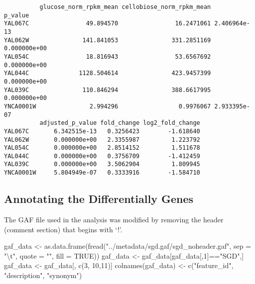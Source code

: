 \documentclass[
  letterpaper,
  DIV=11,
  numbers=noendperiod]{scrartcl}
\newenvironment{Shaded}{\begin{snugshade}}{\end{snugshade}}
\newcommand{\AttributeTok}[1]{\textcolor[rgb]{0.40,0.45,0.13}{#1}}
\newcommand{\ConstantTok}[1]{\textcolor[rgb]{0.56,0.35,0.01}{#1}}
\newcommand{\DecValTok}[1]{\textcolor[rgb]{0.68,0.00,0.00}{#1}}
\newcommand{\FunctionTok}[1]{\textcolor[rgb]{0.28,0.35,0.67}{#1}}
\newcommand{\NormalTok}[1]{\textcolor[rgb]{0.00,0.23,0.31}{#1}}
\newcommand{\OtherTok}[1]{\textcolor[rgb]{0.00,0.23,0.31}{#1}}
\newcommand{\SpecialCharTok}[1]{\textcolor[rgb]{0.37,0.37,0.37}{#1}}
\newcommand{\StringTok}[1]{\textcolor[rgb]{0.13,0.47,0.30}{#1}}
\begin{document}
\begin{verbatim}
          glucose_norm_rpkm_mean cellobiose_norm_rpkm_mean      p_value
YAL067C                49.894570                16.2471061 2.406964e-13
YAL062W               141.841053               331.2851169 0.000000e+00
YAL054C                18.816943                53.6567692 0.000000e+00
YAL044C              1128.504614               423.9457399 0.000000e+00
YAL039C               110.846294               388.6617995 0.000000e+00
YNCA0001W               2.994296                 0.9976067 2.933395e-07
          adjusted_p_value fold_change log2_fold_change
YAL067C       6.342515e-13   0.3256423        -1.618640
YAL062W       0.000000e+00   2.3355987         1.223792
YAL054C       0.000000e+00   2.8514152         1.511678
YAL044C       0.000000e+00   0.3756709        -1.412459
YAL039C       0.000000e+00   3.5062904         1.809945
YNCA0001W     5.804949e-07   0.3333916        -1.584710
\end{verbatim}

\subsection{Annotating the Differentially
Genes}\label{annotating-the-differentially-genes}

The GAF file used in the analysis was modified by removing the header
(comment section) that begins with `!'.

\begin{Shaded}
\begin{Highlighting}[]
\NormalTok{gaf\_data }\OtherTok{\textless{}{-}} \FunctionTok{as.data.frame}\NormalTok{(}\FunctionTok{fread}\NormalTok{(}\StringTok{"../metadata/sgd.gaf/sgd\_noheader.gaf"}\NormalTok{, }
                                \AttributeTok{sep =} \StringTok{"}\SpecialCharTok{\textbackslash{}t}\StringTok{"}\NormalTok{, }\AttributeTok{quote =} \StringTok{""}\NormalTok{, }\AttributeTok{fill =} \ConstantTok{TRUE}\NormalTok{))}
\NormalTok{gaf\_data }\OtherTok{\textless{}{-}}\NormalTok{ gaf\_data[gaf\_data[,}\DecValTok{1}\NormalTok{]}\SpecialCharTok{==}\StringTok{"SGD"}\NormalTok{,]}
\NormalTok{gaf\_data }\OtherTok{\textless{}{-}}\NormalTok{ gaf\_data[, }\FunctionTok{c}\NormalTok{(}\DecValTok{3}\NormalTok{, }\DecValTok{10}\NormalTok{,}\DecValTok{11}\NormalTok{)]}
\FunctionTok{colnames}\NormalTok{(gaf\_data) }\OtherTok{\textless{}{-}} \FunctionTok{c}\NormalTok{(}\StringTok{"feature\_id"}\NormalTok{, }\StringTok{"description"}\NormalTok{, }\StringTok{"synonym"}\NormalTok{)}
\end{Highlighting}
\end{Shaded}
\end{document}
